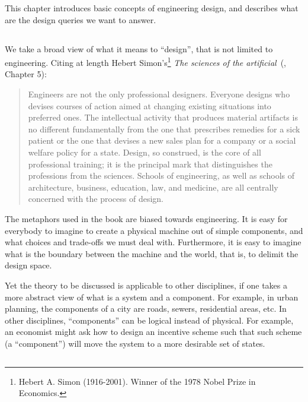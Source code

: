 This chapter introduces basic concepts of engineering design, and describes what are the design queries we want to answer.


\subsection{}

We take a broad view of what it means to ``design'', that is not limited to engineering. Citing at length
Hebert Simon's\footnote{Hebert A. Simon (1916-2001). Winner of the 1978 Nobel Prize in Economics.}
\emph{The sciences of the artificial}~(\cite{hebert96sciences}, Chapter 5):

\begin{quote}
    Engineers are not the only professional designers. Everyone designs who devises courses of action aimed at changing existing situations into preferred ones. The intellectual activity that produces material artifacts is no different fundamentally from the one that prescribes remedies for a sick patient or the one that devises a new sales plan for a company or a social welfare policy for a state. Design, so construed, is the core of all professional training; it is the principal mark that distinguishes the professions from the sciences. Schools of engineering, as well as schools of architecture, business, education, law, and medicine, are all centrally concerned with the process of design.
\end{quote}

The metaphors used in the book are biased towards engineering.
It is easy for everybody to imagine to create a physical machine out of simple components,
and what choices and trade-offs we must deal with. Furthermore, it is easy to imagine
what is the boundary between the machine and the world, that is, to delimit the design space.

Yet the theory to be discussed is applicable to other disciplines, if one takes a more
abstract view of what is a system and a component. For example, in urban planning, the
components of a city are roads, sewers, residential areas, etc. In other disciplines,
``components'' can be logical instead of physical. For example, an economist might ask how to
design an incentive scheme such that such scheme (a ``component'') will move the system to a more
desirable set of states.


\subsection{}

